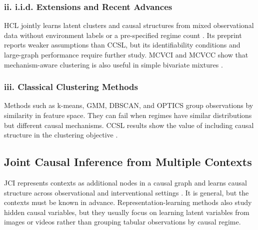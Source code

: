 \subsubsection*{ii. i.i.d. Extensions and Recent Advances}

HCL jointly learns latent clusters and causal structures from mixed observational
data without environment labels or a pre-specified regime count
\cite{li2025hcl}. Its preprint reports weaker assumptions than CCSL, but its
identifiability conditions and large-graph performance require further study.
MCVCI and MCVCC show that mechanism-aware clustering is also useful in simple
bivariate mixtures \cite{liu2025hybrid}.

\subsubsection*{iii. Classical Clustering Methods}

Methods such as k-means, GMM, DBSCAN, and OPTICS group observations by similarity
in feature space. They can fail when regimes have similar distributions but
different causal mechanisms. CCSL results show the value of including causal
structure in the clustering objective \cite{chen2023ccsl}.

\subsection{Joint Causal Inference from Multiple Contexts}

JCI represents contexts as additional nodes in a causal graph and learns causal
structure across observational and interventional settings \cite{mooij2020jci}.
It is general, but the contexts must be known in advance. Representation-learning
methods also study hidden causal variables, but they usually focus on learning
latent variables from images or videos rather than grouping tabular observations by
causal regime.
